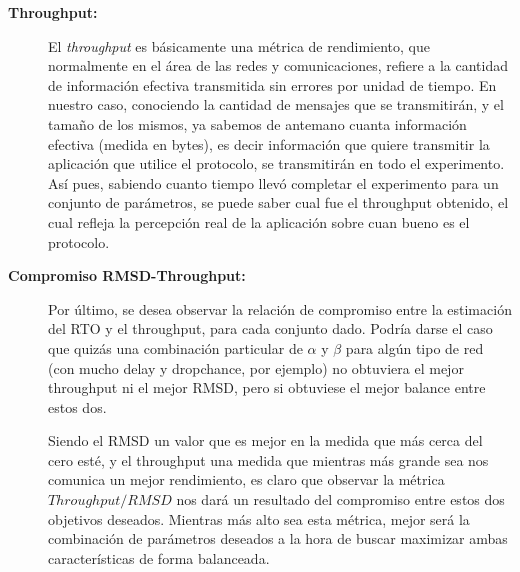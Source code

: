 \begin{description}
    \bigskip
    \item[\textbf{Throughput:}] El \emph{throughput}\cite{throughput} es
        b\'asicamente una m\'etrica de rendimiento, que normalmente en el \'area
        de las redes y comunicaciones, refiere a la cantidad de informaci\'on
        efectiva transmitida sin errores por unidad de tiempo.
        En nuestro caso, conociendo la cantidad de mensajes que se
        transmitir\'an, y el tama\~no de los mismos, ya sabemos de antemano
        cuanta informaci\'on efectiva (medida en bytes), es decir informaci\'on
        que quiere transmitir la aplicaci\'on que utilice el protocolo, se
        transmitir\'an en todo el experimento. As\'i pues, sabiendo cuanto
        tiempo llev\'o completar el experimento para un conjunto de
        par\'ametros, se puede saber cual fue el throughput obtenido, el cual
        refleja la percepci\'on real de la aplicaci\'on sobre cuan bueno es el
        protocolo.

    \bigskip
    \item[\textbf{Compromiso RMSD-Throughput:}] Por \'ultimo, se desea observar
        la relaci\'on de compromiso entre la estimaci\'on del RTO y el
        throughput, para cada conjunto dado. Podr\'ia darse el caso que quiz\'as
        una combinaci\'on particular de $\alpha$ y $\beta$ para alg\'un tipo de
        red (con mucho delay y dropchance, por ejemplo) no obtuviera el mejor
        throughput ni el mejor RMSD, pero si obtuviese el mejor balance entre
        estos dos.

        \par Siendo el RMSD un valor que es mejor en la medida que m\'as cerca
        del cero est\'e, y el throughput una medida que mientras m\'as grande sea
        nos comunica un mejor rendimiento, es claro que observar la m\'etrica
        $Throughput / RMSD$ nos dar\'a un resultado del compromiso entre estos
        dos objetivos deseados. Mientras m\'as alto sea esta m\'etrica, mejor
        ser\'a la combinaci\'on de par\'ametros deseados a la hora de buscar
        maximizar ambas caracter\'isticas de forma balanceada.

\end{description}

